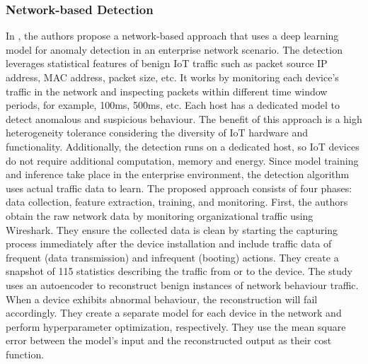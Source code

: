 \documentclass[conference, 11pt]{IEEEtran}
\begin{document}
    \subsubsection{Network-based Detection}
    In \cite{article:4}, the authors propose a network-based approach that uses a deep learning model for anomaly detection in an enterprise network scenario.
    The detection leverages statistical features of benign IoT traffic such as packet source IP address, MAC address, packet size, etc.
    It works by monitoring each device's traffic in the network and inspecting packets within different time window periods, for example, 100ms, 500ms, etc.
    Each host has a dedicated model to detect anomalous and suspicious behaviour.
    The benefit of this approach is a high heterogeneity tolerance considering the diversity of IoT hardware and functionality.
    Additionally, the detection runs on a dedicated host, so IoT devices do not require additional computation, memory and energy.
    Since model training and inference take place in the enterprise environment, the detection algorithm uses actual traffic data to learn.
    The proposed approach consists of four phases: data collection, feature extraction, training, and monitoring.
    First, the authors obtain the raw network data by monitoring organizational traffic using Wireshark.
    They ensure the collected data is clean by starting the capturing process immediately after the device installation and include traffic data of frequent (data transmission) and infrequent (booting) actions.
    They create a snapshot of 115 statistics describing the traffic from or to the device.
    The study uses an autoencoder to reconstruct benign instances of network behaviour traffic.
    When a device exhibits abnormal behaviour, the reconstruction will fail accordingly.
    They create a separate model for each device in the network and perform hyperparameter optimization, respectively.
    They use the mean square error between the model's input and the reconstructed output as their cost function.
\end{document}
